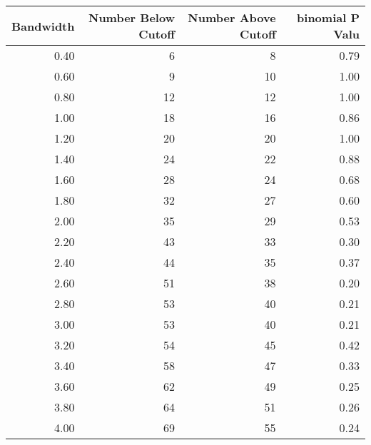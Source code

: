 \begin{tabular}{rrrr}
  \hline
Bandwidth & Number Below Cutoff & Number Above Cutoff & binomial P Valu \\ 
  \hline
0.40 &   6 &   8 & 0.79 \\ 
  0.60 &   9 &  10 & 1.00 \\ 
  0.80 &  12 &  12 & 1.00 \\ 
  1.00 &  18 &  16 & 0.86 \\ 
  1.20 &  20 &  20 & 1.00 \\ 
  1.40 &  24 &  22 & 0.88 \\ 
  1.60 &  28 &  24 & 0.68 \\ 
  1.80 &  32 &  27 & 0.60 \\ 
  2.00 &  35 &  29 & 0.53 \\ 
  2.20 &  43 &  33 & 0.30 \\ 
  2.40 &  44 &  35 & 0.37 \\ 
  2.60 &  51 &  38 & 0.20 \\ 
  2.80 &  53 &  40 & 0.21 \\ 
  3.00 &  53 &  40 & 0.21 \\ 
  3.20 &  54 &  45 & 0.42 \\ 
  3.40 &  58 &  47 & 0.33 \\ 
  3.60 &  62 &  49 & 0.25 \\ 
  3.80 &  64 &  51 & 0.26 \\ 
  4.00 &  69 &  55 & 0.24 \\ 
   \hline
\end{tabular}
